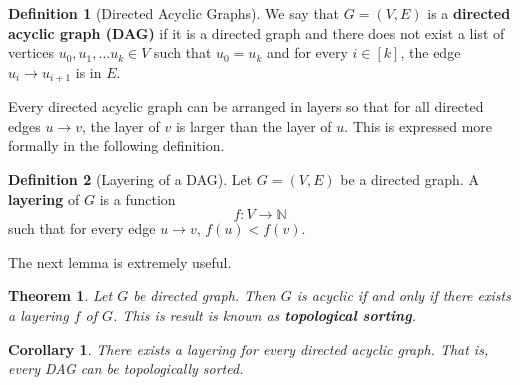 \documentclass[a4paper, 12pt]{report}
\newtheorem{theorem}{Theorem}[section]
\newtheorem{corollary}{Corollary}[theorem]
\theoremstyle{remark}
\theoremstyle{definition}
\newtheorem{definition}{Definition}[section]
\begin{document}
\begin{definition}[Directed Acyclic Graphs]
We say that $G = (V, E)$ is a \textbf{directed acyclic graph (DAG)} if it is a directed graph and there does not exist a list of vertices $u_0, u_1, ... u_k \in V$ such that $u_0 = u_k$ and for every $i \in [k]$, the edge $u_i \rightarrow u_{i+1}$ is in $E$. 
\end{definition}

Every directed acyclic graph can be arranged in layers so that for all directed edges $u \rightarrow v$, the layer of $v$ is larger than the layer of $u$. This is expressed more formally in the following definition. 

\begin{definition}[Layering of a DAG]
Let $G = (V, E)$ be a directed graph. A \textbf{layering} of $G$ is a function 
\[f: V \longrightarrow \mathbb{N}\]
such that for every edge $u \rightarrow v$, $f(u) < f(v)$.
\end{definition}

The next lemma is extremely useful. 
\begin{theorem}
Let $G$ be directed graph. Then $G$ is acyclic if and only if there exists a layering $f$ of $G$. This is result is known as \textbf{topological sorting}. 
\end{theorem}

\begin{corollary}
There exists a layering for every directed acyclic graph. That is, every DAG can be topologically sorted. 
\end{corollary}
\end{document}
